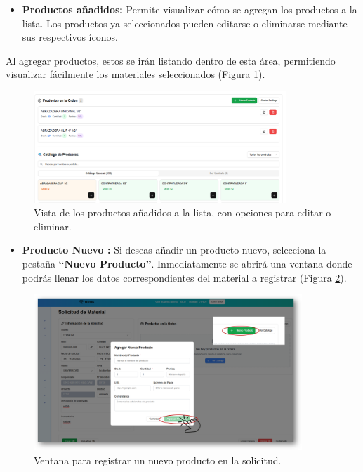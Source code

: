 \begin{itemize}
    \item \textbf{Productos añadidos:} Permite visualizar cómo se agregan los productos a la lista.  
    Los productos ya seleccionados pueden editarse o eliminarse mediante sus respectivos íconos.
\end{itemize}

Al agregar productos, estos se irán listando dentro de esta área, permitiendo visualizar fácilmente los materiales seleccionados (Figura \ref{fig:productos_agregados}).

\begin{figure}[H]
    \centering
    \includegraphics[width=0.85\textwidth]{imgs/Almacen_General/Solicitudes_de_materia_SM/sm_productos_en_la_orden.png}
    \caption{Vista de los productos añadidos a la lista, con opciones para editar o eliminar.}
    \label{fig:productos_agregados}
\end{figure}


\begin{itemize}
    \item \textbf{Producto Nuevo :} Si deseas añadir un producto nuevo, selecciona la pestaña \textbf{“Nuevo Producto”}.  
Inmediatamente se abrirá una ventana donde podrás llenar los datos correspondientes del material a registrar (Figura \ref{fig:producto_nuevo}).
\end{itemize}


\begin{figure}[H]
    \centering
    \includegraphics[width=0.9\textwidth]{imgs/Almacen_General/Solicitudes_de_materia_SM/Agregar_producto_nuevo_despachado.png}
    \caption{Ventana para registrar un nuevo producto en la solicitud.}
    \label{fig:producto_nuevo}
\end{figure}

